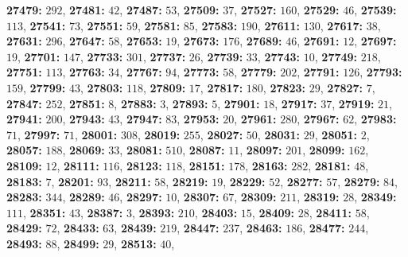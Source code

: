 \textsf{\bfseries 27479:} $292$, \textsf{\bfseries 27481:} $42$, \textsf{\bfseries 27487:} $53$, \textsf{\bfseries 27509:} $37$, \textsf{\bfseries 27527:} $160$, \textsf{\bfseries 27529:} $46$, \textsf{\bfseries 27539:} $113$, \textsf{\bfseries 27541:} $73$, \textsf{\bfseries 27551:} $59$, \textsf{\bfseries 27581:} $85$, \textsf{\bfseries 27583:} $190$, \textsf{\bfseries 27611:} $130$, \textsf{\bfseries 27617:} $38$, \textsf{\bfseries 27631:} $296$, \textsf{\bfseries 27647:} $58$, \textsf{\bfseries 27653:} $19$, \textsf{\bfseries 27673:} $176$, \textsf{\bfseries 27689:} $46$, \textsf{\bfseries 27691:} $12$, \textsf{\bfseries 27697:} $19$, \textsf{\bfseries 27701:} $147$, \textsf{\bfseries 27733:} $301$, \textsf{\bfseries 27737:} $26$, \textsf{\bfseries 27739:} $33$, \textsf{\bfseries 27743:} $10$, \textsf{\bfseries 27749:} $218$, \textsf{\bfseries 27751:} $113$, \textsf{\bfseries 27763:} $34$, \textsf{\bfseries 27767:} $94$, \textsf{\bfseries 27773:} $58$, \textsf{\bfseries 27779:} $202$, \textsf{\bfseries 27791:} $126$, \textsf{\bfseries 27793:} $159$, \textsf{\bfseries 27799:} $43$, \textsf{\bfseries 27803:} $118$, \textsf{\bfseries 27809:} $17$, \textsf{\bfseries 27817:} $180$, \textsf{\bfseries 27823:} $29$, \textsf{\bfseries 27827:} $7$, \textsf{\bfseries 27847:} $252$, \textsf{\bfseries 27851:} $8$, \textsf{\bfseries 27883:} $3$, \textsf{\bfseries 27893:} $5$, \textsf{\bfseries 27901:} $18$, \textsf{\bfseries 27917:} $37$, \textsf{\bfseries 27919:} $21$, \textsf{\bfseries 27941:} $200$, \textsf{\bfseries 27943:} $43$, \textsf{\bfseries 27947:} $83$, \textsf{\bfseries 27953:} $20$, \textsf{\bfseries 27961:} $280$, \textsf{\bfseries 27967:} $62$, \textsf{\bfseries 27983:} $71$, \textsf{\bfseries 27997:} $71$, \textsf{\bfseries 28001:} $308$, \textsf{\bfseries 28019:} $255$, \textsf{\bfseries 28027:} $50$, \textsf{\bfseries 28031:} $29$, \textsf{\bfseries 28051:} $2$, \textsf{\bfseries 28057:} $188$, \textsf{\bfseries 28069:} $33$, \textsf{\bfseries 28081:} $510$, \textsf{\bfseries 28087:} $11$, \textsf{\bfseries 28097:} $201$, \textsf{\bfseries 28099:} $162$, \textsf{\bfseries 28109:} $12$, \textsf{\bfseries 28111:} $116$, \textsf{\bfseries 28123:} $118$, \textsf{\bfseries 28151:} $178$, \textsf{\bfseries 28163:} $282$, \textsf{\bfseries 28181:} $48$, \textsf{\bfseries 28183:} $7$, \textsf{\bfseries 28201:} $93$, \textsf{\bfseries 28211:} $58$, \textsf{\bfseries 28219:} $19$, \textsf{\bfseries 28229:} $52$, \textsf{\bfseries 28277:} $57$, \textsf{\bfseries 28279:} $84$, \textsf{\bfseries 28283:} $344$, \textsf{\bfseries 28289:} $46$, \textsf{\bfseries 28297:} $10$, \textsf{\bfseries 28307:} $67$, \textsf{\bfseries 28309:} $211$, \textsf{\bfseries 28319:} $28$, \textsf{\bfseries 28349:} $111$, \textsf{\bfseries 28351:} $43$, \textsf{\bfseries 28387:} $3$, \textsf{\bfseries 28393:} $210$, \textsf{\bfseries 28403:} $15$, \textsf{\bfseries 28409:} $28$, \textsf{\bfseries 28411:} $58$, \textsf{\bfseries 28429:} $72$, \textsf{\bfseries 28433:} $63$, \textsf{\bfseries 28439:} $219$, \textsf{\bfseries 28447:} $237$, \textsf{\bfseries 28463:} $186$, \textsf{\bfseries 28477:} $244$, \textsf{\bfseries 28493:} $88$, \textsf{\bfseries 28499:} $29$, \textsf{\bfseries 28513:} $40$, 
